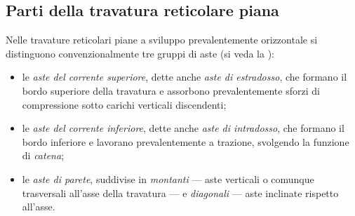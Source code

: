 \subsection{Parti della travatura reticolare piana}
\label{subsec:parti_travatura}

Nelle travature reticolari piane a sviluppo
prevalentemente orizzontale si distinguono
convenzionalmente tre gruppi di aste
(si veda la ):

\begin{itemize}
	\item le \emph{aste del corrente superiore},
	dette anche \emph{aste di estradosso},
	che formano il bordo superiore della
	travatura e assorbono prevalentemente
	sforzi di compressione sotto carichi
	verticali discendenti;
	
	\item le \emph{aste del corrente inferiore},
	dette anche \emph{aste di intradosso},
	che formano il bordo inferiore e lavorano
	prevalentemente a trazione, svolgendo la
	funzione di \emph{catena};
	
	\item le \emph{aste di parete}, suddivise in
	\emph{montanti} --- aste verticali o
	comunque trasversali all'asse della
	travatura --- e \emph{diagonali} --- aste
	inclinate rispetto all'asse.
\end{itemize}


